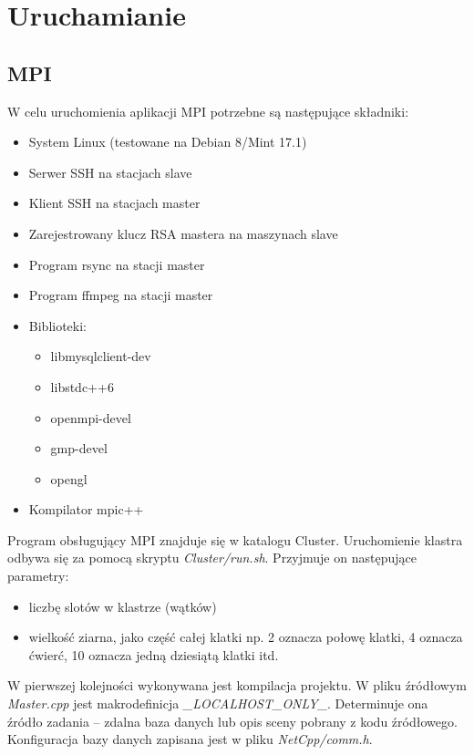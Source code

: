\documentclass[a4paper]{article}
\begin{document}
\newpage

\section{Uruchamianie}

\subsection{MPI}
W celu uruchomienia aplikacji MPI potrzebne są następujące składniki:
\begin{itemize}
\item System Linux (testowane na Debian 8/Mint 17.1)
\item Serwer SSH na stacjach slave
\item Klient SSH na stacjach master
\item Zarejestrowany klucz RSA mastera na maszynach slave
\item Program rsync na stacji master
\item Program ffmpeg na stacji master
\item Biblioteki:
\begin{itemize}
\item libmysqlclient-dev
\item libstdc++6
\item openmpi-devel
\item gmp-devel
\item opengl
\end{itemize}
\item Kompilator mpic++
\end{itemize}

Program obsługujący MPI znajduje się w katalogu Cluster. Uruchomienie klastra odbywa się za pomocą skryptu \textit{Cluster/run.sh}. Przyjmuje on następujące parametry:
\begin{itemize}
\item liczbę slotów w klastrze (wątków)
\item wielkość ziarna, jako część całej klatki np. 2 oznacza połowę klatki, 4 oznacza ćwierć, 10 oznacza jedną dziesiątą klatki itd.
\end{itemize}

W pierwszej kolejności wykonywana jest kompilacja projektu. W pliku źródłowym \textit{Master.cpp} jest makrodefinicja \textit{\_LOCALHOST\_ONLY\_}. Determinuje ona źródło zadania -- zdalna baza danych lub opis sceny pobrany z kodu źródłowego. Konfiguracja bazy danych zapisana jest w pliku \textit{NetCpp/comm.h}. 
\end{document}
